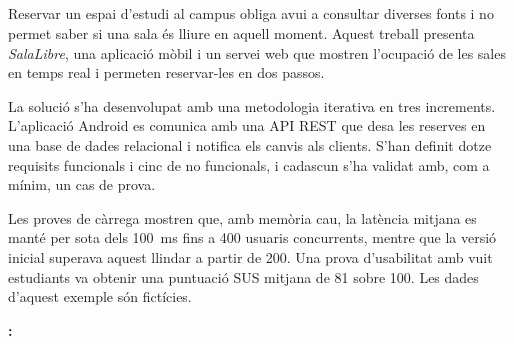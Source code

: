 \begin{otherlanguage}{catalan}
\chapter*{\resumenname}

Reservar un espai d'estudi al campus obliga avui a consultar diverses fonts i
no permet saber si una sala és lliure en aquell moment. Aquest treball presenta
\emph{SalaLibre}, una aplicació mòbil i un servei web que mostren l'ocupació de
les sales en temps real i permeten reservar-les en dos passos.

La solució s'ha desenvolupat amb una metodologia iterativa en tres increments.
L'aplicació Android es comunica amb una API REST que desa les reserves en una
base de dades relacional i notifica els canvis als clients. S'han definit dotze
requisits funcionals i cinc de no funcionals, i cadascun s'ha validat amb, com
a mínim, un cas de prova.

Les proves de càrrega mostren que, amb memòria cau, la latència mitjana es manté
per sota dels \qty{100}{ms} fins a 400 usuaris concurrents, mentre que la versió
inicial superava aquest llindar a partir de 200. Una prova d'usabilitat amb vuit
estudiants va obtenir una puntuació SUS mitjana de 81 sobre 100. Les dades d'aquest exemple són fictícies.

\vspace{1em}
\noindent\textbf{\clavesname:} \tfgclavesCA
\end{otherlanguage}
\cleardoublepage
